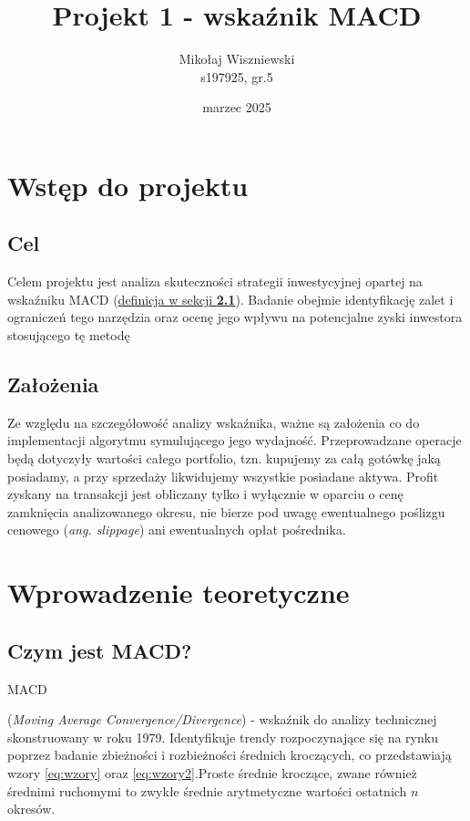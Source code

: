 \documentclass[11pt]{article}
\title{Projekt 1 - wskaźnik MACD}
\date{marzec 2025}
\author{Mikołaj Wiszniewski \\ s197925, gr.5}
\begin{document}
    \maketitle

    \renewcommand*\contentsname{Spis treści}
    \tableofcontents{}

    \newpage


    \section{Wstęp do projektu}

    \subsection{Cel}
    Celem projektu jest analiza skuteczności strategii inwestycyjnej opartej na wskaźniku MACD (\hyperlink{def:macd}{definicja w sekcji \textbf{2.1}}). Badanie obejmie identyfikację zalet i ograniczeń tego narzędzia oraz ocenę jego wpływu na potencjalne zyski inwestora stosującego tę metodę
    
    \subsection{Założenia}
    Ze względu na szczegółowość analizy wskaźnika, ważne są założenia co do implementacji algorytmu symulującego jego wydajność. 
    Przeprowadzane operacje będą dotyczyły wartości całego portfolio, tzn. kupujemy za całą gotówkę jaką posiadamy, a przy sprzedaży likwidujemy wszystkie posiadane aktywa.
    Profit zyskany na transakcji jest obliczany tylko i wyłącznie w oparciu o cenę zamknięcia analizowanego okresu, nie bierze pod uwagę ewentualnego poślizgu cenowego (\textit{ang. slippage}) ani ewentualnych opłat pośrednika.


    \section{Wprowadzenie teoretyczne}

    \subsection{Czym jest MACD?}

    \hypertarget{def:macd}{MACD}(\textit{Moving Average Convergence/Divergence})\cite{wiki:MACD} - wskaźnik do analizy technicznej skonstruowany w roku 1979.
    Identyfikuje trendy rozpoczynające się na rynku poprzez badanie zbieżności i rozbieżności średnich kroczących, co przedstawiają wzory \eqref{eq:wzory} oraz \eqref{eq:wzory2}.Proste średnie kroczące, zwane również średnimi ruchomymi\cite{wiki:Średnia_ruchoma} to zwykłe średnie arytmetyczne wartości ostatnich $n$ okresów.
    
\end{document}
